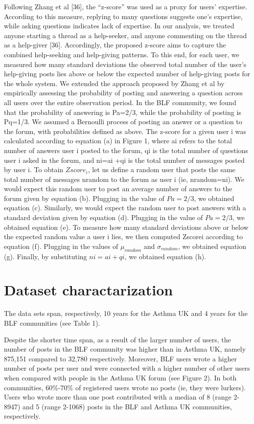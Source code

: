 Following Zhang et al [36], the “z-score” was used as a proxy for users’ expertise. According to this measure, replying to many questions suggests one’s expertise, while asking questions indicates lack of expertise. In our analysis, we treated anyone starting a thread as a help-seeker, and anyone commenting on the thread as a help-giver [36]. Accordingly, the proposed z-score aims to capture the combined help-seeking and help-giving patterns. To this end, for each user, we measured how many standard deviations the observed total number of the user’s help-giving posts lies above or below the expected number of help-giving posts for the whole system. We extended the approach proposed by Zhang et al by empirically assessing the probability of posting and answering a question across all users over the entire observation period. In the BLF community, we found that the probability of answering is Pa=2/3, while the probability of posting is Pq=1/3. We assumed a Bernoulli process of posting an answer or a question to the forum, with probabilities defined as above. The z-score for a given user i was calculated according to equation (a) in Figure 1, where ai refers to the total number of answers user i posted to the forum, qi is the total number of questions user i asked in the forum, and ni=ai +qi is the total number of messages posted by user i.
To obtain $Zscore_i$, let us define a random user that posts the same total number of messages nrandom to the forum as user i (ie, nrandom=ni). We would expect this random user to post an average number of answers to the forum given by equation (b). Plugging in the value of $Pa=2/3$, we obtained equation (c). Similarly, we would expect the random user to post answers with a standard deviation given by equation (d). Plugging in the value of $Pa=2/3$, we obtained equation (e). To measure how many standard deviations above or below the expected random value a user i lies, we then computed Zscorei according to equation (f). Plugging in the values of $\mu_{random}$ and $\sigma_{random}$, we obtained equation (g). Finally, by substituting $ni=ai +qi$, we obtained equation (h). 

\section{Dataset charactarization}
The data sets span, respectively, 10 years for the Asthma UK and 4 years for the BLF communities (see Table 1).

Despite the shorter time span, as a result of the larger number of users, the number of posts in the BLF community was higher than in Asthma UK, namely 875,151 compared to 32,780 respectively. Moreover, BLF users wrote a higher number of posts per user and were connected with a higher number of other users when compared with people in the Asthma UK forum (see Figure 2). In both communities, 60\%-70\% of registered users wrote no posts (ie, they were lurkers). Users who wrote more than one post contributed with a median of 8 (range 2-8947) and 5 (range 2-1068) posts in the BLF and Asthma UK communities, respectively.

